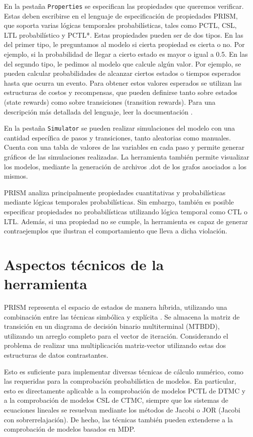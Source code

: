 \documentclass[runningheads]{llncs}
\begin{document}
En la pestaña \texttt{Properties} se especifican las propiedades que queremos verificar. Estas deben escribirse en el lenguaje de especificación de propiedades PRISM, que soporta varias lógicas temporales probabilísticas, tales como PCTL, CSL, LTL probabilístico y PCTL*. Estas propiedades pueden ser de dos tipos. En las del primer tipo, le preguntamos al modelo si cierta propiedad es cierta o no. Por ejemplo, si la probabilidad de llegar a cierto estado es mayor o igual a 0.5. En las del segundo tipo, le pedimos al modelo que calcule algún valor. Por ejemplo, se pueden calcular probabilidades de alcanzar ciertos estados o tiempos esperados hasta que ocurra un evento. Para obtener estos valores esperados se utilizan las estructuras de costos y recompensas, que pueden definirse tanto sobre estados (state rewards) como sobre transiciones (transition rewards). Para una descripción más detallada del lenguaje, leer la documentación \cite{PRISMManual}.

En la pestaña \texttt{Simulator} se pueden realizar simulaciones del modelo con una cantidad específica de pasos y transiciones, tanto aleatorias como manuales. Cuenta con una tabla de valores de las variables en cada paso y permite generar gráficos de las simulaciones realizadas. La herramienta también permite visualizar los modelos, mediante la generación de archivos .dot de los grafos asociados a los mismos.

PRISM analiza principalmente propiedades cuantitativas y probabilísticas mediante lógicas temporales probabilísticas. Sin embargo, también es posible especificar propiedades no probabilísticas utilizando lógica temporal como CTL o LTL. Además, si una propiedad no se cumple, la herramienta es capaz de generar contraejemplos que ilustran el comportamiento que lleva a dicha violación.

\section{Aspectos técnicos de la herramienta}
PRISM representa el espacio de estados de manera híbrida, utilizando una combinación entre las técnicas simbólica y explícita \cite{KNP04b}\cite{Par02}.
Se almacena la matriz de transición en un diagrama de decisión binario multiterminal (MTBDD), utilizando un arreglo completo para el vector de iteración. Considerando el problema de realizar una multiplicación matriz-vector utilizando estas dos estructuras de datos contrastantes.

Esto es suficiente para implementar diversas técnicas de cálculo numérico, como las requeridas para la comprobación probabilística de modelos. En particular, esto es directamente aplicable a la comprobación de modelos PCTL de DTMC y a la comprobación de modelos CSL de CTMC, siempre que los sistemas de ecuaciones lineales se resuelvan mediante los métodos de Jacobi o JOR (Jacobi con sobrerrelajación). De hecho, las técnicas también pueden extenderse a la comprobación de modelos basados en MDP. 
\end{document}
